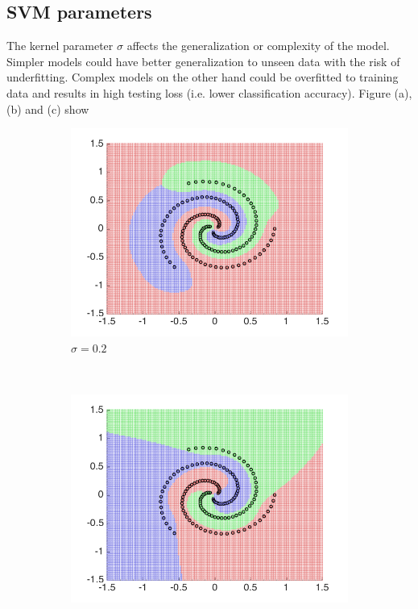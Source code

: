 \documentclass[10pt,twocolumn,letterpaper]{article}
\begin{document}
\subsection{SVM parameters}
The kernel parameter $\sigma$ affects the generalization or complexity of the model. Simpler models could have better generalization to unseen data with the risk of underfitting. Complex models on the other hand could be overfitted to training data and results in high testing loss (i.e. lower classification accuracy). Figure (a), (b) and (c) show                                                                                              \begin{figure}

\begin{subfigure}[H]{0.3 \columnwidth}
\includegraphics[width = 1\columnwidth]{q2_ovr_sig02}\hfill
\caption{$\sigma = 0.2$}
\end{subfigure}
~
\begin{subfigure}[H]{0.3 \columnwidth}
	\includegraphics[width = 1\columnwidth]{q2_ovr_sig1}

\end{subfigure}
\end{figure}
\end{document}

